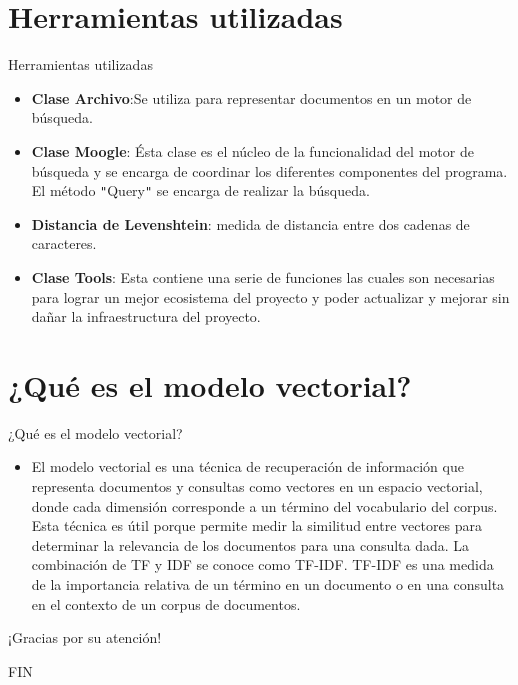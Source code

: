 \documentclass{beamer}
\begin{document}
\section{Herramientas utilizadas}

\begin{frame}{Herramientas utilizadas}
  \begin{itemize}
    \item \textbf{Clase Archivo}:Se utiliza para representar documentos en un motor de b\'usqueda.
    \item \textbf{Clase Moogle}: \'Esta clase es el n\'ucleo de la funcionalidad del motor de b\'usqueda y 
se encarga de coordinar los diferentes componentes del programa. El
m\'etodo \texttt{"}Query\texttt{"} se encarga de realizar la b\'usqueda.
    \item \textbf{Distancia de Levenshtein}: medida de distancia entre dos cadenas de caracteres.
    \item \textbf{Clase Tools}: Esta contiene una serie de funciones las cuales son necesarias para
lograr un mejor ecosistema del proyecto y poder actualizar y mejorar sin da\~nar la infraestructura del proyecto.
  \end{itemize}
\end{frame}

\section{¿Qu\'e es el modelo vectorial?}

\begin{frame}{¿Qu\'e es el modelo vectorial?}
  \begin{itemize}
    \item El modelo
vectorial es una t\'ecnica de recuperaci\'on de informaci\'on que representa documentos y consultas como vectores en un espacio vectorial,
donde cada dimensi\'on corresponde a un t\'ermino del vocabulario del
corpus. Esta t\'ecnica es \'util porque permite medir la similitud entre
vectores para determinar la relevancia de los documentos para una
consulta dada. La combinaci\'on de TF y IDF se conoce
como TF-IDF. TF-IDF es una medida de la importancia relativa de
un t\'ermino en un documento o en una consulta en el contexto de
un corpus de documentos.
  \end{itemize}
\end{frame}

\begin{frame}{¡Gracias por su atención!}
  \begin{center}
    \Large FIN
  \end{center}
\end{frame}
\end{document}
